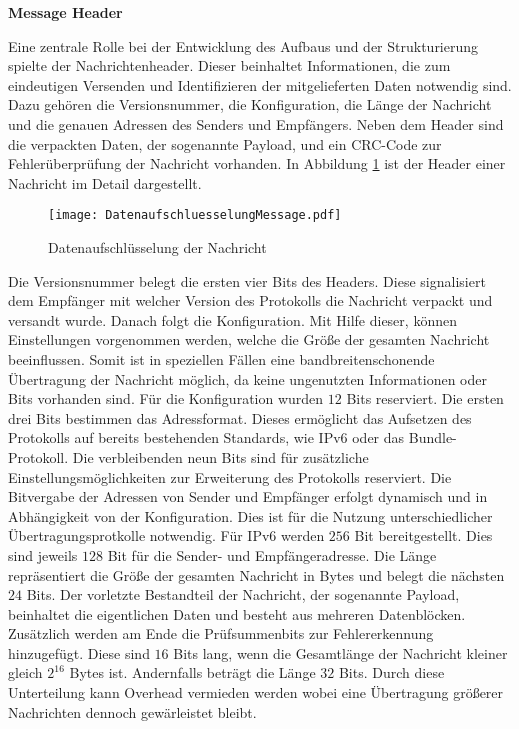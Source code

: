 \label{sec:ProtokolDesign}

\textbf{Message Header}

Eine zentrale Rolle bei der Entwicklung des Aufbaus und der Strukturierung
spielte der Nachrichtenheader.
Dieser beinhaltet Informationen, die zum eindeutigen Versenden und Identifizieren der
mitgelieferten Daten notwendig sind. Dazu gehören die Versionsnummer,
die Konfiguration, die Länge der Nachricht und die genauen Adressen
des Senders und Empfängers. Neben dem Header sind die verpackten Daten, der
sogenannte Payload, und ein CRC-Code zur Fehlerüberprüfung der Nachricht
vorhanden. In Abbildung \ref{fig:DatenaufschluesselungMessage} ist der Header
einer Nachricht im Detail dargestellt.

\begin{figure}[H]
	\centering
	\texttt{[image: DatenaufschluesselungMessage.pdf]}
	\caption{Datenaufschlüsselung der Nachricht}
	\label{fig:DatenaufschluesselungMessage}
\end{figure}

Die Versionsnummer belegt die ersten vier Bits des Headers. Diese
signalisiert dem Empfänger mit welcher Version des Protokolls die Nachricht
verpackt und versandt wurde. Danach folgt die Konfiguration. Mit Hilfe dieser,
können Einstellungen vorgenommen werden, welche die Größe der gesamten Nachricht
beeinflussen. Somit ist in speziellen Fällen eine bandbreitenschonende
Übertragung der Nachricht möglich, da keine ungenutzten Informationen oder Bits
vorhanden sind. Für die Konfiguration wurden $12$ Bits reserviert. Die ersten drei Bits
bestimmen das Adressformat. Dieses ermöglicht das Aufsetzen des Protokolls auf
bereits bestehenden Standards, wie IPv6 oder das Bundle-Protokoll.
Die verbleibenden neun Bits sind für zusätzliche Einstellungsmöglichkeiten zur Erweiterung des
Protokolls reserviert. Die Bitvergabe der Adressen von Sender und Empfänger
erfolgt dynamisch und in Abhängigkeit von der Konfiguration.
Dies ist für die Nutzung unterschiedlicher Übertragungsprotkolle notwendig.
Für IPv6 werden $256$ Bit bereitgestellt. Dies sind jeweils $128$ Bit für
die Sender- und Empfängeradresse. Die Länge repräsentiert die Größe der gesamten
Nachricht in Bytes und belegt die nächsten $24$ Bits.
Der vorletzte Bestandteil der Nachricht, der sogenannte Payload, beinhaltet die
eigentlichen Daten und besteht aus mehreren Datenblöcken. Zusätzlich werden am
Ende die Prüfsummenbits zur Fehlererkennung hinzugefügt. Diese sind $16$ Bits lang,
wenn die Gesamtlänge der Nachricht kleiner gleich $2^{16}$ Bytes ist.
Andernfalls beträgt die Länge $32$ Bits. Durch diese Unterteilung kann
Overhead vermieden werden wobei eine {\"U}bertragung gr{\"o}{\ss}erer
Nachrichten dennoch gew{\"a}rleistet bleibt.

